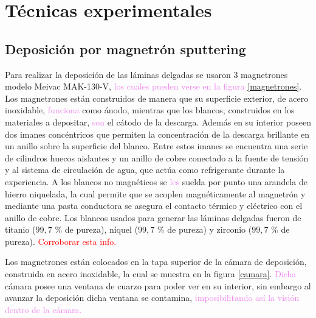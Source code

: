 \documentclass[12pt]{article}
\theoremstyle{definition}
\theoremstyle{remark}
\begin{document}
\newpage

\section{Técnicas experimentales}

\subsection{Deposición por magnetrón sputtering}
Para realizar la deposición de las láminas delgadas se usaron 3 magnetrones modelo Meivac MAK-130-V, \textcolor{violet}{los cuales pueden verse en la figura \ref{magnetrones}}. Los magnetrones están construidos de manera que su superficie exterior, de acero inoxidable, \textcolor{violet}{funciona} como ánodo, mientras que los blancos, construidos en los materiales a depositar, \textcolor{violet}{son} el cátodo de la descarga. Además en su interior poseen dos imanes concéntricos que permiten la concentración de la descarga brillante en un anillo sobre la superficie del blanco. Entre estos imanes se encuentra una serie de cilindros huecos aislantes y un anillo de cobre conectado a la fuente de tensión y al sistema de circulación de agua, que actúa como refrigerante durante la experiencia. A los blancos no magnéticos se \textcolor{violet}{les} suelda por punto una arandela de hierro niquelada, la cual permite que se acoplen magnéticamente al magnetrón y mediante una pasta conductora se asegura el contacto térmico y eléctrico con el anillo de cobre. Los blancos usados para generar las láminas delgadas fueron de titanio ($99,7$ \% de pureza), níquel ($99,7$ \% de pureza) y zirconio ($99,7$ \% de pureza). \textcolor{red}{Corroborar esta info.}


Los magnetrones están colocados en la tapa superior de la cámara de  deposición, construida en acero inoxidable, la cual se muestra en la figura \ref{camara}. \textcolor{violet}{Dicha} cámara posee una ventana de cuarzo para poder ver en su interior, sin embargo al avanzar la deposición dicha ventana se contamina, \textcolor{violet}{imposibilitando así la visión dentro de la cámara.}
\end{document}
